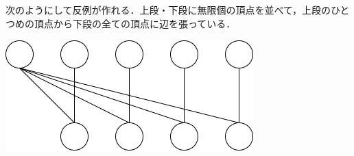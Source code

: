 \subsection{}
次のようにして反例が作れる．上段・下段に無限個の頂点を並べて，上段のひとつめの頂点から下段の全ての頂点に辺を張っている．

\begin{center}
 \includegraphics[width=.5\linewidth]{chap2/2_7.png}
\end{center}